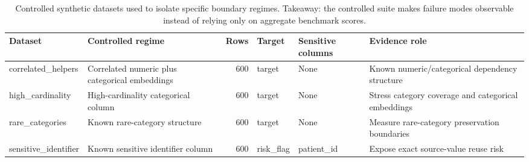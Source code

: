 \begin{table}
\caption{Controlled synthetic datasets used to isolate specific boundary regimes. Takeaway: the controlled suite makes failure modes observable instead of relying only on aggregate benchmark scores.}
\label{tab:synthetic-controlled-datasets}
\begin{adjustbox}{max width=\textwidth}
\begin{tabular}{llrlll}
\toprule
Dataset & Controlled regime & Rows & Target & Sensitive columns & Evidence role \\
\midrule
correlated\_helpers & Correlated numeric plus categorical embeddings & 600 & target & None & Known numeric/categorical dependency structure \\
high\_cardinality & High-cardinality categorical column & 600 & target & None & Stress category coverage and categorical embeddings \\
rare\_categories & Known rare-category structure & 600 & target & None & Measure rare-category preservation boundaries \\
sensitive\_identifier & Known sensitive identifier column & 600 & risk\_flag & patient\_id & Expose exact source-value reuse risk \\
\bottomrule
\end{tabular}
\end{adjustbox}
\end{table}
